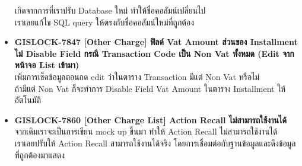 \begin{itemize}
        เกิดจากการที่เราปรับ Database ใหม่ ทำให้ชื่อคอลัมน์เปลี่ยนไป \\
        เราเลยแก้ไข SQL query ให้ตรงกับชื่อคอลัมน์ใหม่ที่ถูกต้อง
    \item \textbf{{GISLOCK-7847 [Other Charge] ฟิลด์ Vat Amount ส่วนของ Installment ไม่ Disable Field กรณี Transaction Code เป็น Non Vat ทั้งหมด (Edit จากหน้าจอ List เข้ามา)}} \\
        เพิ่มการเช็คข้อมูลตอนกด edit ว่าในตาราง Transaction มีแต่ Non Vat หรือไม่ \\
        ถ้ามีแต่ Non Vat ก็จะทำการ Disable Field Vat Amount ในตาราง Installment ให้อัตโนมัติ
    \item \textbf{{GISLOCK-7860 [Other Charge List] Action Recall ไม่สามารถใช้งานได้}} \\
        จากเดิมเราจะเป็นการเขียน mock up ขึ้นมา ทำให้ Action Recall ไม่สามารถใช้งานได้ \\
        เราเลยปรับให้ Action Recall สามารถใช้งานได้จริง โดยการเชื่อมต่อกับฐานข้อมูลและดึงข้อมูลที่ถูกต้องมาแสดง
\end{itemize}

